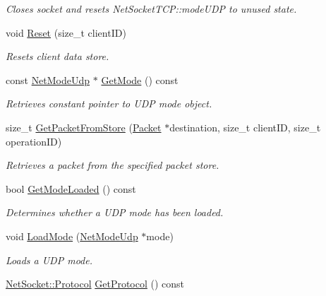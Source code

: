 \begin{DoxyCompactItemize}
\begin{DoxyCompactList}\small\item\em Closes socket and resets NetSocketTCP::modeUDP to unused state. \item\end{DoxyCompactList}\item 
void \hyperlink{class_net_socket_u_d_p_ad45e27b7de414da2146e76dd328c91a3}{Reset} (size\_\-t clientID)
\begin{DoxyCompactList}\small\item\em Resets client data store. \item\end{DoxyCompactList}\item 
const \hyperlink{class_net_mode_udp}{NetModeUdp} $\ast$ \hyperlink{class_net_socket_u_d_p_a22f09fe0a87137338204d30fdbe902b8}{GetMode} () const 
\begin{DoxyCompactList}\small\item\em Retrieves constant pointer to UDP mode object. \item\end{DoxyCompactList}\item 
size\_\-t \hyperlink{class_net_socket_u_d_p_ac7eee38cc64fca5c2144ca8e86497a3d}{GetPacketFromStore} (\hyperlink{class_packet}{Packet} $\ast$destination, size\_\-t clientID, size\_\-t operationID)
\begin{DoxyCompactList}\small\item\em Retrieves a packet from the specified packet store. \item\end{DoxyCompactList}\item 
bool \hyperlink{class_net_socket_u_d_p_a499d202ab574a2b4eee0bb74affb7803}{GetModeLoaded} () const 
\begin{DoxyCompactList}\small\item\em Determines whether a UDP mode has been loaded. \item\end{DoxyCompactList}\item 
void \hyperlink{class_net_socket_u_d_p_af077cea62da3567d90f68c2ddeecb023}{LoadMode} (\hyperlink{class_net_mode_udp}{NetModeUdp} $\ast$mode)
\begin{DoxyCompactList}\small\item\em Loads a UDP mode. \item\end{DoxyCompactList}\item 
\hyperlink{class_net_socket_simple_a31450636f6fb9ece239c50f616e0d7b0}{NetSocket::Protocol} \hyperlink{class_net_socket_u_d_p_a38f2d51c45a6205aa8209edf8d954dbf}{GetProtocol} () const 

\end{DoxyCompactItemize}
